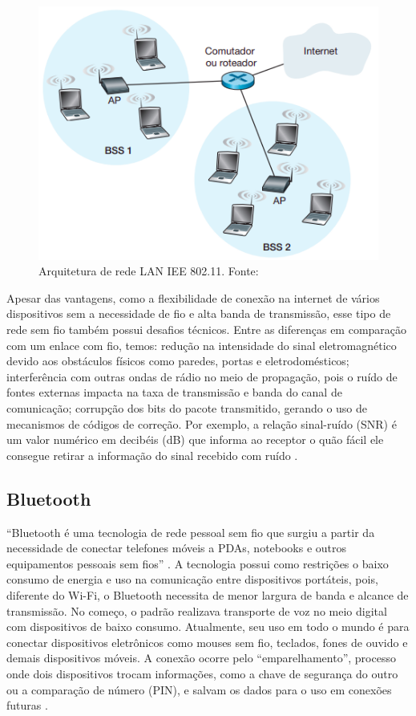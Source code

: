 \begin{figure}[ht]
    \centering
    \includegraphics[width=.42\textwidth]{img/wifi-design.png}
    \caption{Arquitetura de rede LAN IEE 802.11. Fonte:\cite{redeskurose2010}}\label{figWifi}
\end{figure}

Apesar das vantagens, como a flexibilidade de conexão na internet de vários dispositivos sem a necessidade 
de fio e alta banda de transmissão, esse tipo de rede sem fio também possui desafios técnicos. Entre as diferenças 
em comparação com um enlace com fio, temos: redução na intensidade do sinal eletromagnético devido aos obstáculos físicos 
como paredes, portas e eletrodomésticos; interferência com outras ondas de rádio no meio de propagação, pois o ruído de fontes
externas impacta na taxa de transmissão e banda do canal de comunicação; corrupção dos bits do pacote transmitido, gerando 
o uso de mecanismos de códigos de correção. Por exemplo, a relação sinal-ruído (SNR) é um valor numérico em decibéis (dB) que informa 
ao receptor o quão fácil ele consegue retirar a informação do sinal recebido com ruído \cite[pp. 408]{redeskurose2010}.

\subsection{Bluetooth}

``Bluetooth é uma tecnologia de rede pessoal sem fio que surgiu a partir da necessidade de
conectar telefones móveis a PDAs, notebooks e outros equipamentos pessoais sem fios'' \cite[pp. 138]{sistemas-distribuidos-coulouris2013}. A tecnologia
possui como restrições o baixo consumo de energia e uso na comunicação entre dispositivos portáteis, pois, diferente do Wi-Fi, o Bluetooth 
necessita de menor largura de banda e alcance de transmissão. No começo, o padrão realizava transporte de voz no meio digital com dispositivos de baixo consumo. Atualmente, seu uso em todo o mundo é para conectar 
dispositivos eletrônicos como mouses sem fio, teclados, fones de ouvido e demais dispositivos móveis. A conexão ocorre pelo ``emparelhamento'', processo onde dois dispositivos 
trocam informações, como a chave de segurança do outro ou a comparação de número (PIN), e salvam os dados para o uso em conexões futuras \cite{blueetoothIntel}. 

